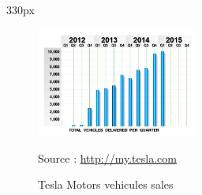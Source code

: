 \begin{frame}
\begin{center}
\begin{columns}
\begin{column}{330px}
{
    \begin{figure}[h!]
        \centering
        \includegraphics[width=200px]
            {images/tesla-vehicules-sales.jpg}
        \caption{Tesla Motors vehicules sales}
        \scriptsize{Source :
            \url{http://my.tesla.com}}
    \end{figure}
}
\end{column}
\end{columns}
\end{center}
\end{frame}
